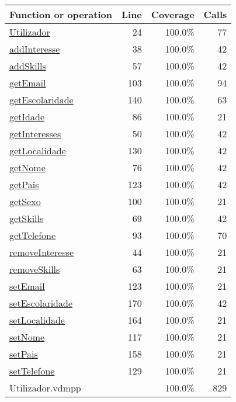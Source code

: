 \bigskip
\begin{longtable}{|l|r|r|r|}
\hline
Function or operation & Line & Coverage & Calls \\
\hline
\hline
\hyperref[Utilizador:24]{Utilizador} & 24&100.0\% & 77 \\
\hline
\hyperref[addInteresse:38]{addInteresse} & 38&100.0\% & 42 \\
\hline
\hyperref[addSkills:57]{addSkills} & 57&100.0\% & 42 \\
\hline
\hyperref[getEmail:103]{getEmail} & 103&100.0\% & 94 \\
\hline
\hyperref[getEscolaridade:140]{getEscolaridade} & 140&100.0\% & 63 \\
\hline
\hyperref[getIdade:86]{getIdade} & 86&100.0\% & 21 \\
\hline
\hyperref[getInteresses:50]{getInteresses} & 50&100.0\% & 42 \\
\hline
\hyperref[getLocalidade:130]{getLocalidade} & 130&100.0\% & 42 \\
\hline
\hyperref[getNome:76]{getNome} & 76&100.0\% & 42 \\
\hline
\hyperref[getPais:123]{getPais} & 123&100.0\% & 42 \\
\hline
\hyperref[getSexo:100]{getSexo} & 100&100.0\% & 21 \\
\hline
\hyperref[getSkills:69]{getSkills} & 69&100.0\% & 42 \\
\hline
\hyperref[getTelefone:93]{getTelefone} & 93&100.0\% & 70 \\
\hline
\hyperref[removeInteresse:44]{removeInteresse} & 44&100.0\% & 21 \\
\hline
\hyperref[removeSkills:63]{removeSkills} & 63&100.0\% & 21 \\
\hline
\hyperref[setEmail:123]{setEmail} & 123&100.0\% & 21 \\
\hline
\hyperref[setEscolaridade:170]{setEscolaridade} & 170&100.0\% & 42 \\
\hline
\hyperref[setLocalidade:164]{setLocalidade} & 164&100.0\% & 21 \\
\hline
\hyperref[setNome:117]{setNome} & 117&100.0\% & 21 \\
\hline
\hyperref[setPais:158]{setPais} & 158&100.0\% & 21 \\
\hline
\hyperref[setTelefone:129]{setTelefone} & 129&100.0\% & 21 \\
\hline
\hline
Utilizador.vdmpp & & 100.0\% & 829 \\
\hline
\end{longtable}

